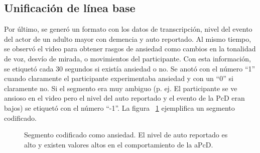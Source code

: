 	\subsection{Unificaci\'on de l\'inea base}\label{secc:unificacion}
	Por \'ultimo, se gener\'o un formato con los datos de transcripci\'on, nivel del evento del actor de un adulto mayor con demencia y auto reportado. Al mismo tiempo, se observ\'o el video para obtener rasgos de ansiedad como cambios en la tonalidad de voz, desv\'io de mirada, o movimientos del participante. Con esta informaci\'on, se etiquet\'o cada 30 segundos si exist\'ia ansiedad o no. Se anot\'o con el n\'umero ``1'' cuando claramente el participante experimentaba ansiedad y con un ``0'' si claramente no. Si el segmento era muy ambiguo (p. ej. El participante se ve ansioso en el video pero el nivel del auto reportado y el evento de la PcD eran bajos) se etiquet\'o con el n\'umero ``-1''. La figura ~\ref{fig:imggtlabel} ejemplifica un segmento codificado.
	\begin{figure}[h!]
		\centering
		\caption{Segmento codificado como ansiedad. El nivel de auto reportado es alto y existen valores altos en el comportamiento de la aPcD. }\label{fig:imggtlabel}
	\end{figure}
